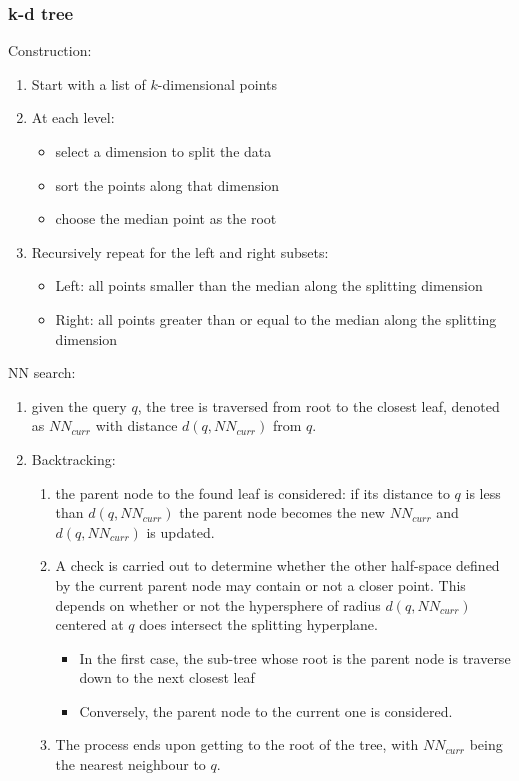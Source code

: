 \documentclass{article}
\begin{document}
\subsubsection{k-d tree}
Construction:
\begin{enumerate}
    \item Start with a list of $k$-dimensional points 
    \item At each level: 
        \begin{itemize}
            \item select a dimension to split the data 
            \item sort the points along that dimension 
            \item choose the median point as the root
        \end{itemize} 
    \item Recursively repeat for the left and right subsets:
        \begin{itemize}
            \item Left: all points smaller than the median along the splitting dimension 
            \item Right: all points greater than or equal to the median along the splitting dimension
        \end{itemize}
\end{enumerate}
NN search:
\begin{enumerate}
    \item given the query $q$, the tree is traversed from root to the closest leaf, denoted as $NN_{curr}$ with distance $d(q,NN_{curr})$ from $q$. 
    \item Backtracking:
        \begin{enumerate}
            \item the parent node to the found leaf is considered: if its distance to $q$ is less than $d(q,NN_{curr})$ the parent node becomes the new $NN_{curr}$ and $d(q,NN_{curr})$ is updated. 
            \item A check is carried out to determine whether the other half-space defined by the current parent node may contain or not a closer point. This depends on whether or not the hypersphere of radius $d(q,NN_{curr})$ centered at $q$ does intersect the splitting hyperplane.
                \begin{itemize}
                    \item In the first case, the sub-tree whose root is the parent node is traverse down to the next closest leaf 
                    \item Conversely, the parent node to the current one is considered.
                \end{itemize}
            \item The process ends upon getting to the root of the tree, with $NN_{curr}$ being the nearest neighbour to $q$.
        \end{enumerate}
\end{enumerate}
\end{document}
